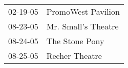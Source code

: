 \begin{supertabular}{p{0.25\columnwidth}p{0.75\columnwidth}}
 02-19-05 &   PromoWest Pavilion \\
 08-23-05 &  Mr. Small's Theatre \\
 08-24-05 &       The Stone Pony \\
 08-25-05 &       Recher Theatre \\
\end{supertabular}
